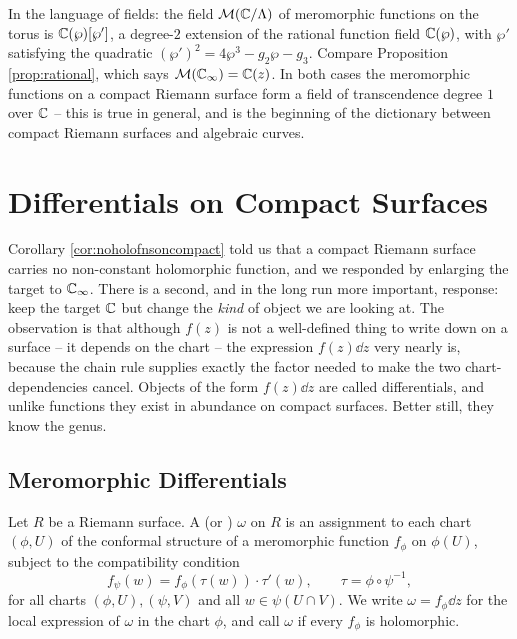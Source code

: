 \documentclass[a4paper]{scrartcl}
\newcommand{\Cinf}{\C_\infty}
\begin{document}
In the language of fields: the field $\mathcal{M}(\mathbb{C}/\Lambda)$ of meromorphic functions on
the torus is $\mathbb{C}(\wp)[\wp']$, a degree-$2$ extension of the rational function field
$\mathbb{C}(\wp)$, with $\wp'$ satisfying the quadratic $(\wp')^2 = 4\wp^3-g_2\wp-g_3$. Compare
Proposition \ref{prop:rational}, which says $\mathcal{M}(\Cinf) = \C(z)$. In both cases
the meromorphic functions on a compact Riemann surface form a field of transcendence
degree $1$ over $\mathbb{C}$ -- this is true in general, and is the beginning of the dictionary
between compact Riemann surfaces and algebraic curves.

\section{Differentials on Compact Surfaces}\label{sec:differentials}

Corollary \ref{cor:noholofnsoncompact} told us that a compact Riemann surface carries no
non-constant holomorphic function, and we responded by enlarging the target to $\Cinf$.
There is a second, and in the long run more important, response: keep the target $\mathbb{C}$ but
change the \emph{kind} of object we are looking at. The observation is that although
$f(z)$ is not a well-defined thing to write down on a surface -- it depends on the chart
-- the expression $f(z)\dd z$ very nearly is, because the chain rule supplies exactly the
factor needed to make the two chart-dependencies cancel. Objects of the form $f(z)\dd z$
are called differentials, and unlike functions they exist in abundance on compact
surfaces. Better still, they know the genus.

\subsection{Meromorphic Differentials}

\begin{definition}
	Let $R$ be a Riemann surface. A  (or
	) $\omega$ on $R$ is an assignment to each chart
	$(\phi, U)$ of the conformal structure of a meromorphic function $f_\phi$ on
	$\phi(U)$, subject to the compatibility condition
	$$
	f_\psi(w) = f_\phi\left(\tau(w)\right)\cdot\tau'(w), \qquad
	\tau = \phi\circ\psi^{-1},
	$$
	for all charts $(\phi,U), (\psi,V)$ and all $w \in \psi(U\cap V)$. We write
	$\omega = f_\phi \dd z$ for the local expression of $\omega$ in the chart $\phi$, and
	call $\omega$  if every $f_\phi$ is holomorphic.
\end{definition}
\end{document}
